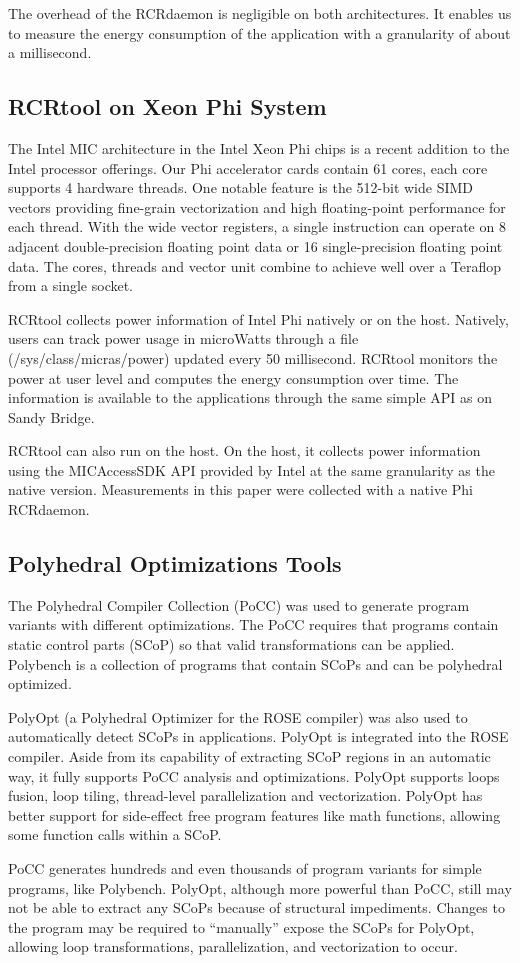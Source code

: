 The overhead of the RCRdaemon is negligible on both architectures.  
It enables us to measure the energy consumption of the application 
with a granularity of about a millisecond. 

\subsection{RCRtool on Xeon Phi System}
The Intel MIC architecture in the Intel Xeon Phi chips is a recent addition to the
Intel processor offerings.
Our Phi accelerator cards contain 61 cores, each core supports 4 hardware threads. 
One notable feature is the 512-bit wide SIMD vectors providing fine-grain
vectorization and high floating-point performance for each thread.
With the wide vector registers, a single 
instruction can operate on 8 adjacent double-precision floating point data or 16 
single-precision floating point data. The cores, threads and vector unit combine
to achieve well over a Teraflop from a single socket.

RCRtool collects power information of Intel Phi natively
or on the host. Natively, users can track power usage in microWatts through    
a file (/sys/class/micras/power) updated every 50 millisecond.
RCRtool monitors the power at user level and computes the energy
consumption over time.
The information is available to the applications through the same simple API as on
Sandy Bridge.

RCRtool can also run on the host. On the host, it collects
power information using the MICAccessSDK API provided by Intel at the same 
granularity as the native version. 
Measurements in this paper were collected with a native Phi RCRdaemon.
 
\subsection{Polyhedral Optimizations Tools}
The Polyhedral Compiler Collection (PoCC)\cite{PoCC} was used to generate program 
variants with different optimizations.
The PoCC requires that programs contain static control parts (SCoP)\cite{SCoP1,SCoP2} so that 
valid transformations can be applied. Polybench is a collection of programs
that contain SCoPs and can be polyhedral optimized.  

PolyOpt (a Polyhedral Optimizer for the ROSE compiler)\cite{Polyopt} was also used to 
automatically detect SCoPs in applications. PolyOpt is integrated into the ROSE compiler.
Aside from its capability of extracting SCoP regions in an automatic way, it fully
supports PoCC analysis and optimizations. PolyOpt supports 
loops fusion, loop tiling, thread-level parallelization and vectorization. PolyOpt
has better support for side-effect free program features like math 
functions\cite{Math-Poly}, allowing some function calls within a SCoP.

PoCC generates hundreds and even thousands of program variants for simple programs, like Polybench.
PolyOpt, although more powerful than PoCC, still may not be able to extract any SCoPs
because of structural impediments. Changes to the program
may be required to  ``manually'' expose the SCoPs for PolyOpt, allowing 
loop transformations, parallelization, and vectorization to occur.
